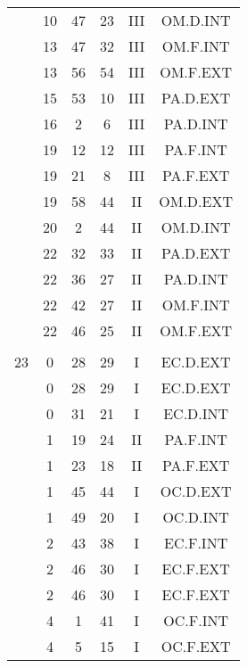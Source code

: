 \documentclass[12pt, a4paper]{article}
\begin{document}
\begin{multicols}{3}
{\begin{tabular}{c c c c c c}
	 	 	 	 & 10 & 47 & 23 & III & OM.D.INT\\%
	 	 	 	 & 13 & 47 & 32 & III & OM.F.INT\\%
	 	 	 	 & 13 & 56 & 54 & III & OM.F.EXT\\%
	 	 	 	 & 15 & 53 & 10 & III & PA.D.EXT\\%
	 	 	 	 & 16 & 2 & 6 & III & PA.D.INT\\%
	 	 	 	 & 19 & 12 & 12 & III & PA.F.INT\\%
	 	 	 	 & 19 & 21 & 8 & III & PA.F.EXT\\%
	 	 	 	 & 19 & 58 & 44 & II & OM.D.EXT\\%
	 	 	 	 & 20 & 2 & 44 & II & OM.D.INT\\%
	 	 	 	 & 22 & 32 & 33 & II & PA.D.EXT\\%
	 	 	 	 & 22 & 36 & 27 & II & PA.D.INT\\%
	 	 	 	 & 22 & 42 & 27 & II & OM.F.INT\\%
	 	 	 	 & 22 & 46 & 25 & II & OM.F.EXT\\%
	 	 	 	 & & & & & \\%
	 	 	 	23 & 0 & 28 & 29 & I & EC.D.EXT\\%
	 	 	 	 & 0 & 28 & 29 & I & EC.D.EXT\\%
	 	 	 	 & 0 & 31 & 21 & I & EC.D.INT\\%
	 	 	 	 & 1 & 19 & 24 & II & PA.F.INT\\%
	 	 	 	 & 1 & 23 & 18 & II & PA.F.EXT\\%
	 	 	 	 & 1 & 45 & 44 & I & OC.D.EXT\\%
	 	 	 	 & 1 & 49 & 20 & I & OC.D.INT\\%
	 	 	 	 & 2 & 43 & 38 & I & EC.F.INT\\%
	 	 	 	 & 2 & 46 & 30 & I & EC.F.EXT\\%
	 	 	 	 & 2 & 46 & 30 & I & EC.F.EXT\\%
	 	 	 	 & 4 & 1 & 41 & I & OC.F.INT\\%
	 	 	 	 & 4 & 5 & 15 & I & OC.F.EXT\\%
	 	 \end{tabular}
 	}
\end{multicols}
\end{document}

